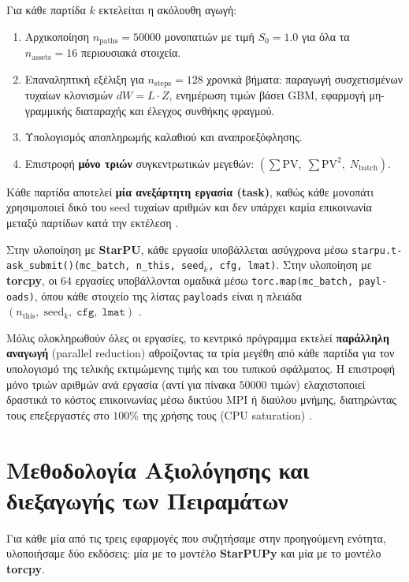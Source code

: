 Για κάθε παρτίδα $k$ εκτελείται η ακόλουθη αγωγή:

\begin{enumerate}
  \item Αρχικοποίηση $n_\mathrm{paths}=50000$ μονοπατιών με τιμή $S_0=1.0$ για όλα τα $n_\mathrm{assets}=16$ περιουσιακά στοιχεία.
  \item Επαναληπτική εξέλιξη για $n_\mathrm{steps}=128$ χρονικά βήματα: παραγωγή συσχετισμένων τυχαίων κλονισμών $dW = L \cdot Z$, ενημέρωση τιμών βάσει GBM, εφαρμογή μη-γραμμικής διαταραχής και έλεγχος συνθήκης φραγμού.
  \item Υπολογισμός αποπληρωμής καλαθιού και αναπροεξόφλησης.
  \item Επιστροφή \textbf{μόνο τριών} συγκεντρωτικών μεγεθών: $(\sum\mathrm{PV},\; \sum\mathrm{PV}^2,\; N_\mathrm{batch})$.
\end{enumerate}

Κάθε παρτίδα αποτελεί \textbf{μία ανεξάρτητη εργασία (task)}, καθώς κάθε μονοπάτι χρησιμοποιεί δικό του seed τυχαίων αριθμών και δεν υπάρχει καμία επικοινωνία μεταξύ παρτίδων κατά την εκτέλεση \cite{appcode}.

Στην υλοποίηση με \textbf{StarPU}, κάθε εργασία υποβάλλεται ασύγχρονα μέσω \texttt{starpu.t-\linebreak ask\_submit()(mc\_batch, n\_this, seed$_k$, cfg, lmat)}. Στην υλοποίηση με \textbf{torcpy}, οι $64$ εργασίες υποβάλλονται ομαδικά μέσω \texttt{torc.map(mc\_batch, payl-\linebreak oads)}, όπου κάθε στοιχείο της λίστας \texttt{payloads} είναι η πλειάδα $(n_\mathrm{this},\; \mathrm{seed}_k,\; \texttt{cfg},\; \texttt{lmat})$ \cite{appcode}.

Μόλις ολοκληρωθούν όλες οι εργασίες, το κεντρικό πρόγραμμα εκτελεί \textbf{παράλληλη αναγωγή} (parallel reduction) αθροίζοντας τα τρία μεγέθη από κάθε παρτίδα για τον υπολογισμό της τελικής εκτιμώμενης τιμής και του τυπικού σφάλματος. Η επιστροφή μόνο τριών αριθμών ανά εργασία (αντί για πίνακα $50000$ τιμών) ελαχιστοποιεί δραστικά το κόστος επικοινωνίας μέσω δικτύου MPI ή διαύλου μνήμης, διατηρώντας τους επεξεργαστές στο $100\%$ της χρήσης τους (CPU saturation) \cite{appcode}.

\section{Μεθοδολογία Αξιολόγησης και διεξαγωγής των Πειραμάτων}

Για κάθε μία από τις τρεις εφαρμογές που συζητήσαμε στην προηγούμενη ενότητα, υλοποιήσαμε δύο εκδόσεις: μία με το μοντέλο \textbf{StarPUPy} και μία με το μοντέλο \textbf{torcpy}.

